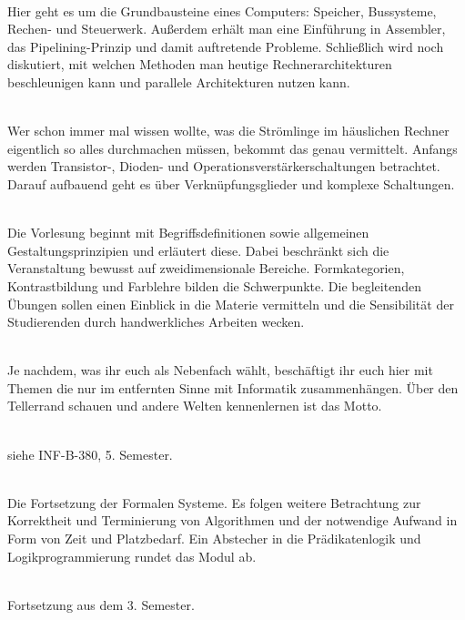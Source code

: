 \textbf{} \\
Hier geht es um die Grundbausteine eines Computers:
Speicher, Bussysteme, Rechen- und Steuerwerk.
Außerdem erhält man eine Einführung in Assembler, das Pipelining-Prinzip und damit auftretende Probleme.
Schließlich wird noch diskutiert, mit welchen Methoden man heutige Rechnerarchitekturen beschleunigen kann und parallele Architekturen nutzen kann.

\textbf{} \\
Wer schon immer mal wissen wollte, was die Strömlinge im häuslichen Rechner eigentlich so alles durchmachen müssen, bekommt das genau vermittelt.
Anfangs werden Transistor-, Dioden- und Operationsverstärkerschaltungen betrachtet.
Darauf aufbauend geht es über Verknüpfungsglieder und komplexe Schaltungen.

\textbf{} \\
Die Vorlesung beginnt mit Begriffsdefinitionen sowie allgemeinen Gestaltungsprinzipien und erläutert diese.
Dabei beschränkt sich die Veranstaltung bewusst auf zweidimensionale Bereiche.
Formkategorien, Kontrastbildung und Farblehre bilden die Schwerpunkte.
Die begleitenden Übungen sollen einen Einblick in die Materie vermitteln und die Sensibilität der Studierenden durch handwerkliches Arbeiten wecken.

\textbf{} \\
Je nachdem, was ihr euch als Nebenfach wählt, beschäftigt ihr euch hier mit Themen die nur im entfernten Sinne mit Informatik zusammenhängen.
Über den Tellerrand schauen und andere Welten kennenlernen ist das Motto.

\textbf{} \\
siehe INF-B-380, 5. Semester.

\hline

\textbf{} \\
Die Fortsetzung der Formalen Systeme.
Es folgen weitere Betrachtung zur Korrektheit und Terminierung von Algorithmen und der notwendige Aufwand in Form von Zeit und Platzbedarf.
Ein Abstecher in die Prädikatenlogik und Logikprogrammierung rundet das Modul ab.

\textbf{} \\
Fortsetzung aus dem 3. Semester.

